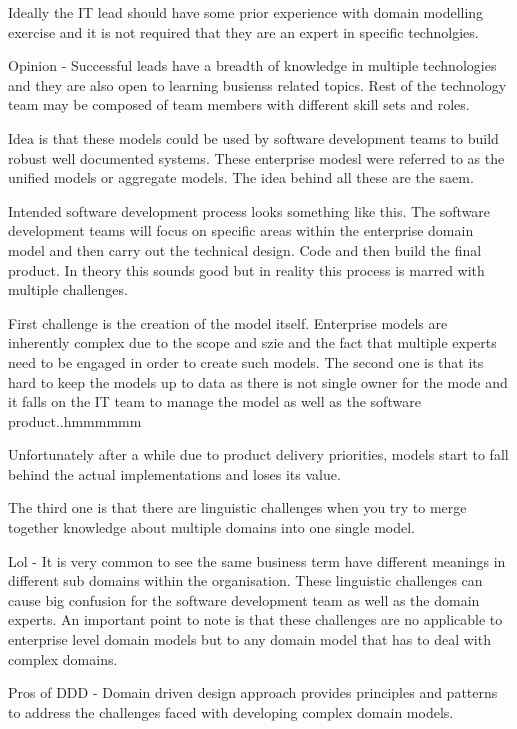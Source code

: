 \documentclass[a4paper, 11pt]{book}
\begin{document}
    Ideally the IT lead should have some prior experience with domain modelling exercise and it is not required that they are an expert in specific technolgies.

    Opinion
    - Successful leads have a breadth of knowledge in multiple technologies and they are also open to learning busienss related topics.
    Rest of the technology team may be composed of team members with different skill sets and roles.

    Idea is that these models could be used by software development teams to build robust well documented systems.
    These enterprise modesl were referred to as the unified models or aggregate models.
    The idea behind all these are the saem.

    Intended software development process looks something like this.
    The software development teams will focus on specific areas within the enterprise domain model and then carry out the technical design.
    Code and then build the final product.
    In theory this sounds good but in reality this process is marred with multiple challenges.

    First challenge is the creation of the model itself.
    Enterprise models are inherently complex due to the scope and szie and the fact that multiple experts need to be engaged in order to create such models.
    The second one is that its hard to keep the models up to data as there is not single owner for the mode and it falls on the IT team to manage the model as well as the software product..hmmmmmm

    Unfortunately after a while due to product delivery priorities, models start to fall behind the actual implementations and loses its value.

    The third one is that there are linguistic challenges when you try to merge together knowledge about multiple domains into one single model.

    Lol - It is very common to see the same business term have different meanings in different sub domains within the organisation.
    These linguistic challenges can cause big confusion for the software development team as well as the domain experts.
    An important point to note is that these challenges are no applicable to enterprise level domain models but to any domain model that has to deal with complex domains.

    Pros of DDD
    - Domain driven design approach provides principles and patterns to address the challenges faced with developing complex domain models.
\end{document}
